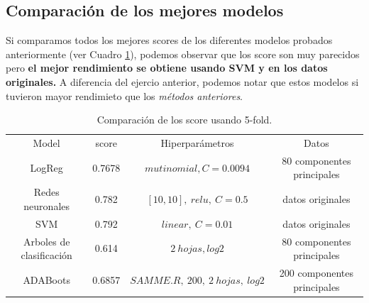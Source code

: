 \documentclass[paper=letter, fontsize=11pt]{scrartcl}
\numberwithin{equation}{section} %
\numberwithin{figure}{section} %
\numberwithin{table}{section} %
\begin{document}
\subsection{Comparación de los mejores modelos}
Si comparamos todos los mejores scores de los diferentes modelos probados anteriormente (ver Cuadro \ref{compa}), podemos observar que los score son muy parecidos pero \textbf{el mejor rendimiento se obtiene usando SVM y en los datos originales.} A diferencia del ejercio anterior, podemos notar que estos modelos si tuvieron mayor rendimieto que los \textit{métodos anteriores}.
\begin{table}[H]
\centering
\begin{tabular}{cccc}
\hline \hline
Model & score &Hiperparámetros &Datos \\
LogReg & 0.7678 &$mutinomial, C=0.0094$& 80 componentes principales\\
Redes neuronales & 0.782 &$[10,10],\ relu,\ C=0.5$&datos originales\\
SVM & 0.792  &$linear, \ C=0.01$ &datos originales\\
Arboles de clasificación & 0.614 & $2\ hojas, log2$& 80 componentes principales\\
ADABoots & 0.6857&$SAMME.R,\ 200,\ 2 \ hojas,\ log2$ &200 componentes principales  \\ \hline \hline 
\end{tabular}
\caption{Comparación de los score usando 5-fold.}\label{compa}
\end{table}
\end{document}
